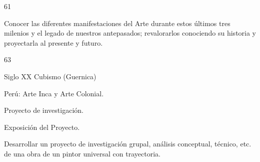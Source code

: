 \begin{syllabus}
\begin{unit}{}{}{6}{1}
\begin{unitgoals}
	\item Conocer las diferentes manifestaciones del Arte durante estos últimos tres milenios y el legado de nuestros antepasados; revalorarlos conociendo su historia y proyectarla al presente y futuro.
\end{unitgoals}
\end{unit}

\begin{unit}{}{}{6}{3}
\begin{topics}
	\item Siglo XX Cubismo (Guernica)
	\item Perú: Arte Inca y Arte Colonial.
	\item Proyecto de investigación.
	\item Exposición del Proyecto.
\end{topics}
\begin{unitgoals}
	\item Desarrollar un proyecto de investigación grupal, análisis conceptual, técnico, etc. de una obra de un pintor universal con trayectoria.
\end{unitgoals}
\end{unit}



\begin{coursebibliography}
\end{coursebibliography}
\end{syllabus}
